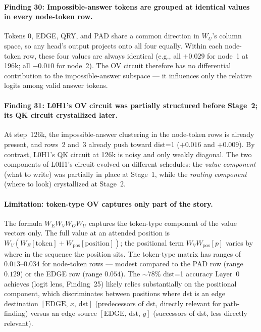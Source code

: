 \documentclass[11pt, a4paper]{article}
\begin{document}
\paragraph{Finding 30: Impossible-answer tokens are grouped at identical
values in every node-token row.}
Tokens 0, EDGE, QRY, and PAD share a common direction in $W_U$'s column
space, so any head's output projects onto all four equally.  Within each
node-token row, these four values are always identical (e.g., all $+0.029$
for node~1 at 196k; all $-0.010$ for node~2).  The OV circuit therefore has
no differential contribution to the impossible-answer subspace --- it
influences only the relative logits among valid answer tokens.

\paragraph{Finding 31: L0H1's OV circuit was partially structured before
Stage~2; its QK circuit crystallized later.}
At step~126k, the impossible-answer clustering in the node-token rows is
already present, and rows~2 and~3 already push toward dist=1 ($+0.016$ and
$+0.009$).  By contrast, L0H1's QK circuit at 126k is noisy and only weakly
diagonal.  The two components of L0H1's circuit evolved on different
schedules: the \emph{value component} (what to write) was partially in place
at Stage~1, while the \emph{routing component} (where to look) crystallized
at Stage~2.

\paragraph{Limitation: token-type OV captures only part of the story.}
The formula $W_E W_V W_O W_U$ captures the token-type component of the value
vectors only.  The full value at an attended position is
$W_V(W_E[\text{token}] + W_{\text{pos}}[\text{position}])$; the positional
term $W_V W_{\text{pos}}[p]$ varies by where in the sequence the position
sits.  The token-type matrix has ranges of $0.013$--$0.034$ for node-token
rows --- modest compared to the PAD row (range $0.129$) or the EDGE row
(range $0.054$).  The $\sim$78\% dist=1 accuracy Layer~0 achieves (logit
lens, Finding~25) likely relies substantially on the positional component,
which discriminates between positions where dst is an edge destination
$[\text{EDGE},\, x,\, \text{dst}]$ (predecessors of dst, directly relevant
for path-finding) versus an edge source $[\text{EDGE},\, \text{dst},\, y]$
(successors of dst, less directly relevant).
\end{document}
